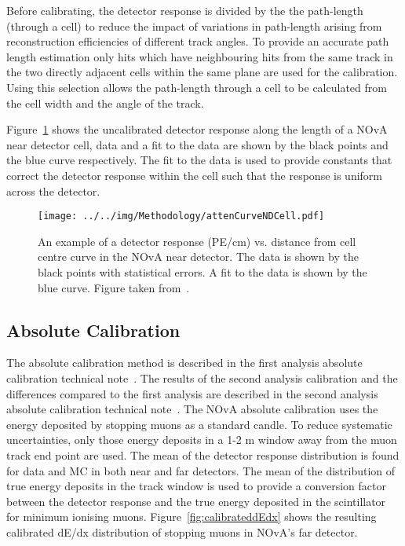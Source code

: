 Before calibrating, the detector response is divided by the the
path-length (through a cell) to reduce the impact of variations in
path-length arising from reconstruction efficiencies of different
track angles. 
To provide an accurate path length estimation only hits which have
neighbouring hits from the same track in the two directly adjacent
cells within the same plane are used for the calibration. 
Using this selection allows the path-length
through a cell to be calculated from the cell width and the angle of
the track. 

Figure~\ref{fig:attenCurvND} shows the uncalibrated
detector response along the length of a NOvA near detector cell, data
and a fit to the data are shown by the black points and the blue curve
respectively. The fit to the data is used to provide constants that
correct the detector response within the cell such that the response
is uniform across the detector.~\cite{alexAtten}~\cite{prabAtten}

\begin{figure}[h]
  \centering
  \texttt{[image: ../../img/Methodology/attenCurveNDCell.pdf]}
  \caption{
    An example of a detector response (PE/cm) vs. distance from cell centre curve in the
    NOvA near detector. The data is shown by the black points with
    statistical errors. A fit to the data is shown by the blue
    curve. Figure taken from~\cite{alexAtten}.\label{fig:attenCurvND}
  }  
\end{figure}


\subsection{Absolute Calibration}
The absolute calibration method is described in the first analysis
absolute calibration technical note~\cite{lukeAbsCal}. The results of the
second analysis calibration and the differences compared to the first
analysis are described in the second analysis absolute calibration
technical note~\cite{dianaAbsCal}.
The NOvA absolute calibration uses the energy deposited by stopping
muons as a standard candle. 
To reduce systematic uncertainties, only those
energy deposits in a 1-2 m window away from the muon track end point
are used. 
The mean of the detector response distribution is found for
data and MC in both near and far detectors. 
The mean of the distribution of true energy deposits in the track
window is used to provide a conversion factor between the detector
response and the true energy deposited in the scintillator for minimum
ionising muons.
Figure~\ref{fig:calibrateddEdx} shows the resulting calibrated dE/dx
distribution of stopping muons in NOvA's far
detector.~\cite{lukeAbsCal} 

